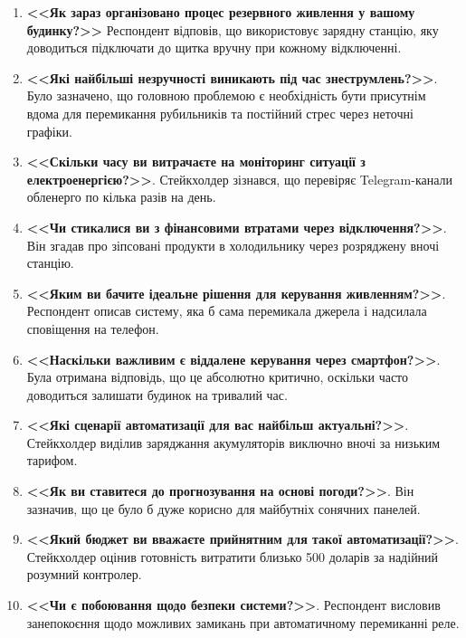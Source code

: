 \documentclass[14pt, a4paper]{extreport}
\begin{document}
	\begin{enumerate}
		\item \textbf{<<Як зараз організовано процес резервного живлення у вашому будинку?>>} Респондент відповів, що використовує зарядну станцію, яку доводиться підключати до щитка вручну при кожному відключенні. 
		
		\item \textbf{<<Які найбільші незручності виникають під час знеструмлень?>>}. Було зазначено, що головною проблемою є необхідність бути присутнім вдома для перемикання рубильників та постійний стрес через неточні графіки.
		
		\item \textbf{<<Скільки часу ви витрачаєте на моніторинг ситуації з електроенергією?>>}. Стейкхолдер зізнався, що перевіряє Telegram-канали обленерго по кілька разів на день.
		
		\item \textbf{<<Чи стикалися ви з фінансовими втратами через відключення?>>}. Він згадав про зіпсовані продукти в холодильнику через розряджену вночі станцію.
		
		\item \textbf{<<Яким ви бачите ідеальне рішення для керування живленням?>>}. Респондент описав систему, яка б сама перемикала джерела і надсилала сповіщення на телефон.
		
		\item \textbf{<<Наскільки важливим є віддалене керування через смартфон?>>}. Була отримана відповідь, що це абсолютно критично, оскільки часто доводиться залишати будинок на тривалий час.
		
		\item \textbf{<<Які сценарії автоматизації для вас найбільш актуальні?>>}. Стейкхолдер виділив заряджання акумуляторів виключно вночі за низьким тарифом.
		
		\item \textbf{<<Як ви ставитеся до прогнозування на основі погоди?>>}. Він зазначив, що це було б дуже корисно для майбутніх сонячних панелей.
		
		\item \textbf{<<Який бюджет ви вважаєте прийнятним для такої автоматизації?>>}. Стейкхолдер оцінив готовність витратити близько 500 доларів за надійний розумний контролер.
		
		\item \textbf{<<Чи є побоювання щодо безпеки системи?>>}. Респондент висловив занепокоєння щодо можливих замикань при автоматичному перемиканні реле.
	\end{enumerate}
\end{document}
